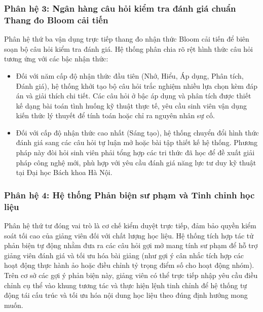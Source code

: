 \subsubsection*{Phân hệ 3: Ngân hàng câu hỏi kiểm tra đánh giá chuẩn Thang đo Bloom cải tiến}
Phân hệ thứ ba vận dụng trực tiếp thang đo nhận thức Bloom cải tiến để biên soạn bộ câu hỏi kiểm tra đánh giá. Hệ thống phân chia rõ rệt hình thức câu hỏi tương ứng với các bậc nhận thức:
\begin{itemize}
    \item Đối với năm cấp độ nhận thức đầu tiên (Nhớ, Hiểu, Áp dụng, Phân tích, Đánh giá), hệ thống khởi tạo bộ câu hỏi trắc nghiệm nhiều lựa chọn kèm đáp án và giải thích chi tiết. Các câu hỏi ở bậc áp dụng và phân tích được thiết kế dạng bài toán tình huống kỹ thuật thực tế, yêu cầu sinh viên vận dụng kiến thức lý thuyết để tính toán hoặc chỉ ra nguyên nhân sự cố.
    \item Đối với cấp độ nhận thức cao nhất (Sáng tạo), hệ thống chuyển đổi hình thức đánh giá sang các câu hỏi tự luận mở hoặc bài tập thiết kế hệ thống. Phương pháp này đòi hỏi sinh viên phải tổng hợp các tri thức đã học để đề xuất giải pháp công nghệ mới, phù hợp với yêu cầu đánh giá năng lực tư duy kỹ thuật tại Đại học Bách khoa Hà Nội.
\end{itemize}

\subsubsection*{Phân hệ 4: Hệ thống Phản biện sư phạm và Tinh chỉnh học liệu}
Phân hệ thứ tư đóng vai trò là cơ chế kiểm duyệt trực tiếp, đảm bảo quyền kiểm soát tối cao của giảng viên đối với chất lượng học liệu. Hệ thống tích hợp tác tử phản biện tự động nhằm đưa ra các câu hỏi gợi mở mang tính sư phạm để hỗ trợ giảng viên đánh giá và tối ưu hóa bài giảng (như gợi ý cân nhắc tích hợp các hoạt động thực hành ảo hoặc điều chỉnh tỷ trọng điểm số cho hoạt động nhóm). Trên cơ sở các gợi ý phản biện này, giảng viên có thể trực tiếp nhập yêu cầu điều chỉnh cụ thể vào khung tương tác và thực hiện lệnh tinh chỉnh để hệ thống tự động tái cấu trúc và tối ưu hóa nội dung học liệu theo đúng định hướng mong muốn.
